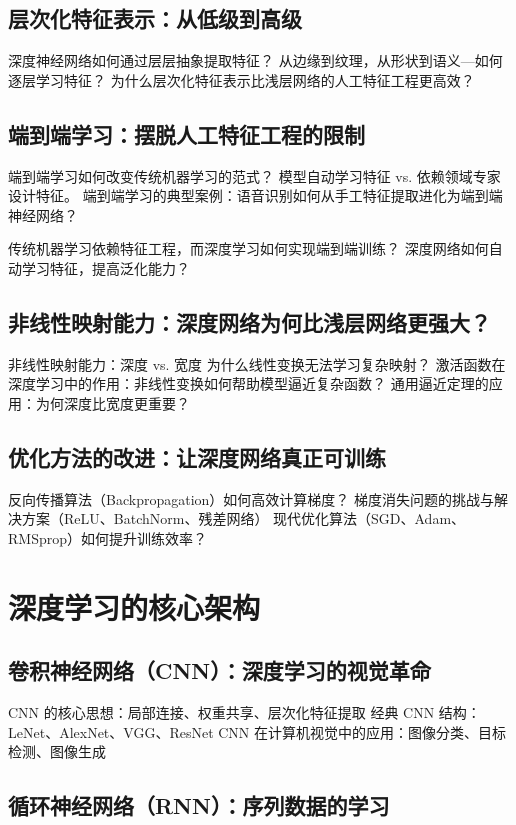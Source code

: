 \subsection{层次化特征表示：从低级到高级}
深度神经网络如何通过层层抽象提取特征？
从边缘到纹理，从形状到语义---如何逐层学习特征？
为什么层次化特征表示比浅层网络的人工特征工程更高效？

\subsection{端到端学习：摆脱人工特征工程的限制}
端到端学习如何改变传统机器学习的范式？
模型自动学习特征 vs. 依赖领域专家设计特征。
端到端学习的典型案例：语音识别如何从手工特征提取进化为端到端神经网络？

传统机器学习依赖特征工程，而深度学习如何实现端到端训练？
深度网络如何自动学习特征，提高泛化能力？

\subsection{非线性映射能力：深度网络为何比浅层网络更强大？}
非线性映射能力：深度 vs. 宽度
为什么线性变换无法学习复杂映射？
激活函数在深度学习中的作用：非线性变换如何帮助模型逼近复杂函数？
通用逼近定理的应用：为何深度比宽度更重要？


\subsection{优化方法的改进：让深度网络真正可训练}

反向传播算法（Backpropagation）如何高效计算梯度？
梯度消失问题的挑战与解决方案（ReLU、BatchNorm、残差网络）
现代优化算法（SGD、Adam、RMSprop）如何提升训练效率？

\section{深度学习的核心架构}
\subsection{卷积神经网络（CNN）：深度学习的视觉革命}

CNN 的核心思想：局部连接、权重共享、层次化特征提取
经典 CNN 结构：LeNet、AlexNet、VGG、ResNet
CNN 在计算机视觉中的应用：图像分类、目标检测、图像生成
\subsection{循环神经网络（RNN）：序列数据的学习}

